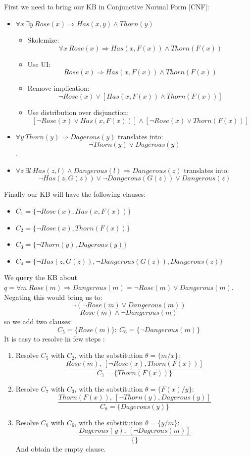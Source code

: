 \documentclass[10pt,a4paper]{article}
\begin{document}
First we need to bring our KB in Conjunctive Normal Form [CNF]:
\begin{itemize}
\item $\forall x\ \exists y \ Rose(x) \Rightarrow Has(x,y)\wedge Thorn(y)$
\begin{itemize}
\item Skolemize:
\[\forall x\ Rose(x) \Rightarrow Has(x,F(x))\wedge Thorn(F(x))\]
\item Use UI:
\[Rose(x) \Rightarrow Has(x,F(x))\wedge Thorn(F(x))\]
\item Remove implication:
\[\neg Rose(x) \vee [Has(x,F(x))\wedge Thorn(F(x))]\]
\item Use distribution over disjunction:
\[[\neg Rose(x) \vee Has(x,F(x))] \wedge [\neg Rose(x) \vee Thorn(F(x))]\]

\end{itemize}
\item $\forall y\ Thorn(y) \Rightarrow Dagerous(y)$ translates into:
\[\neg Thorn(y) \vee Dagerous(y)\].
\item $\forall z\ \exists l\ Has(z,l)\wedge Dangerous(l) \Rightarrow Dangerous(z)$ translates into:
\[\neg Has(z,G(z))\vee \neg Dangerous(G(z)) \vee Dangerous(z)\]

\end{itemize}

Finally our KB will have the following clauses:
\begin{itemize}
\item $C_1=\lbrace \neg Rose(x) , Has(x,F(x))\rbrace$
\item $C_2=\lbrace \neg Rose(x) , Thorn(F(x)) \rbrace$
\item $C_3=\lbrace \neg Thorn(y), Dagerous(y) \rbrace$
\item $C_4=\lbrace \neg Has(z,G(z)), \neg Dangerous(G(z)) , Dangerous(z) \rbrace$
\end{itemize}
We query the KB about $q=\forall m\ Rose(m) \Rightarrow Dangerous(m)=\neg Rose(m) \vee Dangerous(m)$. Negating this would bring us to:
\[\neg (\neg Rose(m) \vee Dangerous(m))\]
\[  Rose(m) \wedge \neg Dangerous(m)\]
 so we add two clauses:
\[C_5=\lbrace  Rose(m)\rbrace;\ C_6=\lbrace \neg  Dangerous(m)\rbrace\]
It is easy to resolve in few steps :
\begin{enumerate}
\item Resolve $C_5$ with $C_2$, with the substitution $\theta=\lbrace m/x \rbrace$:
\[\frac{Rose(m),\ [\neg Rose(x),Thorn(F(x))]}{C_7=\lbrace Thorn(F(x)) \rbrace}\]
\item Resolve $C_7$ with $C_3$, with the substitution $\theta=\lbrace F(x)/y \rbrace$:
\[\frac{Thorn(F(x)),\ [\neg Thorn(y), Dagerous(y)]}{C_8=\lbrace Dagerous(y) \rbrace}\]
\item Resolve $C_8$ with $C_6$, with the substitution $\theta=\lbrace y/m \rbrace$:
\[\frac{Dagerous(y) ,\ [\neg Dagerous(m) ]}{\lbrace \rbrace}\]
And obtain the empty clause.
\end{enumerate}
\end{document}
